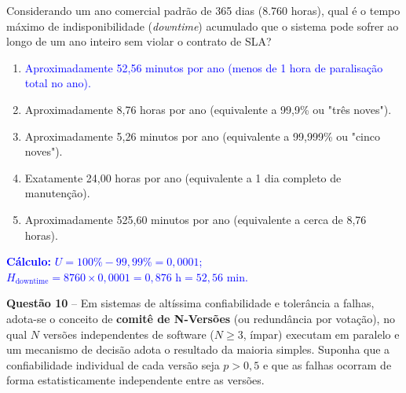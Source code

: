 \documentclass[12pt,a4paper]{article}
\begin{document}
\vspace{0.2cm}

Considerando um ano comercial padrão de 365 dias (8.760 horas), qual é o tempo máximo de indisponibilidade (\textit{downtime}) acumulado que o sistema pode sofrer ao longo de um ano inteiro sem violar o contrato de SLA?

\vspace{0.3cm}

\begin{enumerate}[label=\textbf{(\Alph*)}]
    \item[\textcolor{blue}{\textbf{(A)}}] \textcolor{blue}{Aproximadamente 52,56 minutos por ano (menos de 1 hora de paralisação total no ano).}

    \item Aproximadamente 8,76 horas por ano (equivalente a 99,9\% ou "três noves").

    \item Aproximadamente 5,26 minutos por ano (equivalente a 99,999\% ou "cinco noves").

    \item Exatamente 24,00 horas por ano (equivalente a 1 dia completo de manutenção).

    \item Aproximadamente 525,60 minutos por ano (equivalente a cerca de 8,76 horas).
\end{enumerate}

\vspace{0.2cm}
\noindent\textcolor{blue}{\small\textbf{Cálculo:} $U = 100\% - 99{,}99\% = 0{,}0001$; $H_{\text{downtime}} = 8760 \times 0{,}0001 = 0{,}876\text{ h} = 52{,}56\text{ min}$.}

\vspace{0.5cm}

\textbf{Questão 10} -- Em sistemas de altíssima confiabilidade e tolerância a falhas, adota-se o conceito de \textbf{comitê de N-Versões} (ou redundância por votação), no qual $N$ versões independentes de software ($N \ge 3$, ímpar) executam em paralelo e um mecanismo de decisão adota o resultado da maioria simples. Suponha que a confiabilidade individual de cada versão seja $p > 0,5$ e que as falhas ocorram de forma estatisticamente independente entre as versões.

\vspace{0.2cm}
\end{document}
